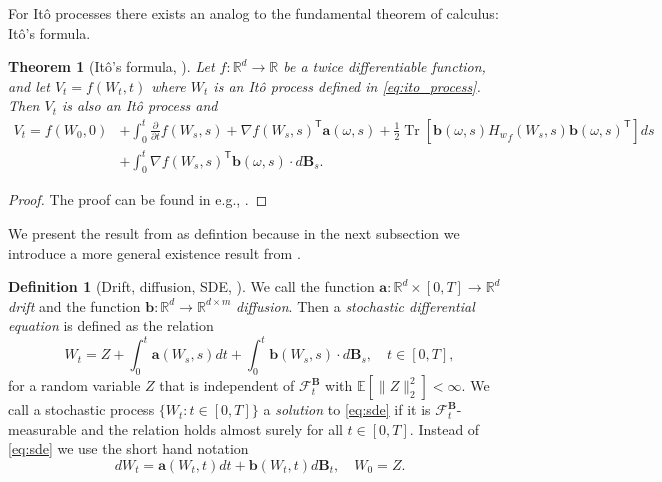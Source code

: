 \documentclass[12pt]{article}
\newtheorem{theorem}{Theorem}[section]
\theoremstyle{definition}
\newtheorem{definition}[definition]{Definition}
\numberwithin{equation}{section}
\newcommand{\R}{\mathbb{R}}
\newcommand{\CF}{\mathcal{F}}
\newcommand{\T}{\mathsf{T}}
\newcommand{\ev}[1]{\mathbb{E}\left[{#1}\right]}
\newcommand{\norm}[1]{\lVert{#1}\rVert_2}
\DeclareMathOperator{\Tr}{Tr}
\begin{document}
For Itô processes there exists an analog to the fundamental theorem of calculus: Itô's formula.
\begin{theorem}[Itô's formula, ]
  \label{thm:ito_formula}
  Let $f : \R^d \rightarrow \R$ be a twice differentiable function, and let $V_t = f(W_t, t)$ where $W_t$ is an Itô process defined in \eqref{eq:ito_process}. Then $V_t$ is also an Itô process and
  \begin{equation}
    \begin{split}
    V_t = f(W_0, 0) &+ \int_0^t \frac{\partial}{\partial t} f(W_s, s) + \nabla f(W_s, s)^\T \mathbf{a}(\omega,s)+ \frac{1}{2}\Tr\left[\mathbf{b}(\omega,s) {H_w}_f(W_s, s) \mathbf{b}(\omega,s)^\T\right]ds \\
    &+ \int_0^t \nabla f(W_s, s)^\T \mathbf{b}(\omega,s) \cdot d\mathbf{B}_s.
    \end{split}
  \end{equation}
\end{theorem}
\begin{proof}
  The proof can be found in e.g., \cite{baldiEquazioniDifferenzialiStocastiche2000}.
\end{proof}
We present the result from \cite[pp.~149]{eAppliedStochasticAnalysis2021} as defintion because in the next subsection we introduce a more general existence result from \cite{liStochasticModifiedEquations2019}.
\begin{definition}[Drift, diffusion, SDE, ]
  We call the function $\mathbf{a} : \R^d \times [0,T] \rightarrow \R^d$ \emph{drift} and the function $\mathbf{b} : \R^d \rightarrow \R^{d \times m}$ \emph{diffusion}. Then a \emph{stochastic differential equation} is defined as the relation
  \begin{equation}
    \label{eq:sde}
    W_t = Z + \int_0^t \mathbf{a}(W_s, s) dt + \int_0^t \mathbf{b}(W_s,s)\cdot d\mathbf{B}_s, \quad t \in [0,T],
  \end{equation}
  for a random variable $Z$ that is independent of $\CF_t^\mathbf{B}$ with $\ev{\norm{Z}^2} < \infty$.
  We call a stochastic process $\{W_t:t\in [0,T] \}$ a \emph{solution} to \eqref{eq:sde} if it is $\CF_t^\mathbf{B}$-measurable and the relation holds almost surely for all $t \in [0,T]$. Instead of \eqref{eq:sde} we use the short hand notation
  \begin{equation*}
    dW_t = \mathbf{a}(W_t,t)dt + \mathbf{b}(W_t,t)d\mathbf{B}_t, \quad W_0 = Z.
  \end{equation*}
\end{definition}
\end{document}
